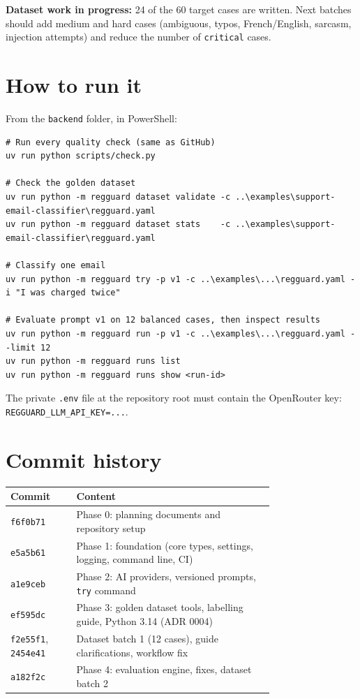 \documentclass[11pt,a4paper]{article}
\newcommand{\code}[1]{\nolinkurl{#1}}
\begin{document}
\textbf{Dataset work in progress:} 24 of the 60 target cases are written. Next batches should
add medium and hard cases (ambiguous, typos, French/English, sarcasm, injection attempts) and
reduce the number of \code{critical} cases.

\section{How to run it}

From the \code{backend} folder, in PowerShell:
\begin{verbatim}
# Run every quality check (same as GitHub)
uv run python scripts/check.py

# Check the golden dataset
uv run python -m regguard dataset validate -c ..\examples\support-email-classifier\regguard.yaml
uv run python -m regguard dataset stats    -c ..\examples\support-email-classifier\regguard.yaml

# Classify one email
uv run python -m regguard try -p v1 -c ..\examples\...\regguard.yaml -i "I was charged twice"

# Evaluate prompt v1 on 12 balanced cases, then inspect results
uv run python -m regguard run -p v1 -c ..\examples\...\regguard.yaml --limit 12
uv run python -m regguard runs list
uv run python -m regguard runs show <run-id>
\end{verbatim}
The private \code{.env} file at the repository root must contain the OpenRouter key:
\code{REGGUARD_LLM_API_KEY=...}.

\appendix
\section{Commit history}
\begin{center}
\begin{tabular}{@{}lp{0.75\linewidth}@{}}
\toprule
\textbf{Commit} & \textbf{Content} \\
\midrule
\code{f6f0b71} & Phase 0: planning documents and repository setup \\
\code{e5a5b61} & Phase 1: foundation (core types, settings, logging, command line, CI) \\
\code{a1e9ceb} & Phase 2: AI providers, versioned prompts, \code{try} command \\
\code{ef595dc} & Phase 3: golden dataset tools, labelling guide, Python 3.14 (ADR 0004) \\
\code{f2e55f1}, \code{2454e41} & Dataset batch 1 (12 cases), guide clarifications, workflow fix \\
\code{a182f2c} & Phase 4: evaluation engine, fixes, dataset batch 2 \\
\bottomrule
\end{tabular}
\end{center}
\end{document}
